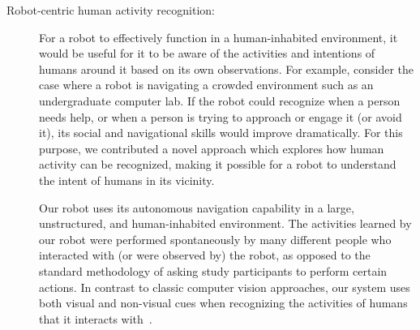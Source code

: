 \documentclass[runningheads,a4paper]{llncs}
\begin{document}
\begin{description}
\item[Robot-centric human activity recognition:] 
For a robot to effectively function in a human-inhabited environment,
it would be useful for it to be aware of the activities and
intentions of humans around it based on its own observations. For
example, consider the case where a robot is navigating a crowded
environment such as an undergraduate computer lab. If the robot could
recognize when a person needs help, or when a person is trying to
approach or engage it (or avoid it), its social and navigational
skills would improve dramatically.  For this purpose, we contributed a novel 
approach which explores how human activity can be
recognized, making it possible for a robot to understand the intent
of humans in its vicinity.


Our robot uses its autonomous
navigation capability in a large, unstructured, and human-inhabited
environment.
The activities
learned by our robot were performed spontaneously by many different
people who interacted with (or were observed by) the robot, as opposed
to the standard methodology of asking study participants to perform
certain actions. 
In contrast to classic computer vision
approaches, our system uses both visual and non-visual cues when
recognizing the activities of humans that it interacts with~\cite{gori2015robot}.





\end{description}
\end{document}
